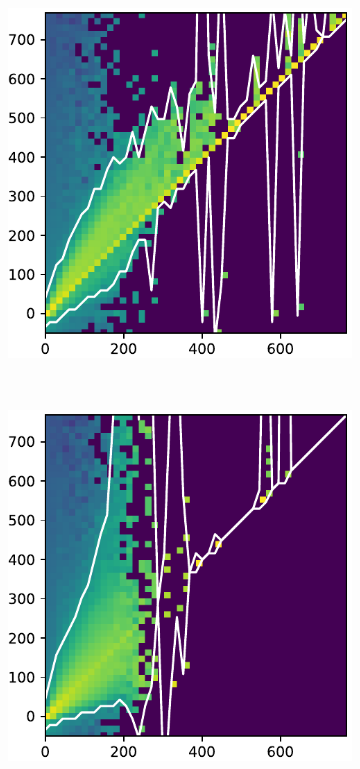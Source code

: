 \documentclass[10pt,letterpaper]{article}
\begin{document}
				\begin{figure}[h!]
					\centering
					\begin{subfigure}[t]{0.288\textwidth}
						\centering
						\includegraphics[width=\textwidth]{fig/hist_0}
					\end{subfigure}
					~ 
					\begin{subfigure}[t]{0.288\textwidth}
						\centering
						\includegraphics[width=\textwidth]{fig/hist_1}

\end{subfigure}
\end{figure}
\end{document}
